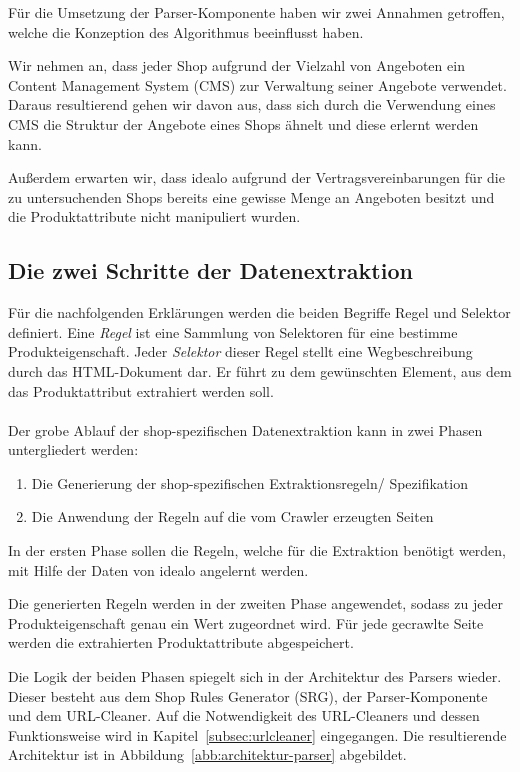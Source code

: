Für die Umsetzung der Parser-Komponente haben wir zwei Annahmen getroffen, welche die Konzeption des Algorithmus
beeinflusst haben.

Wir nehmen an, dass jeder Shop aufgrund der Vielzahl von Angeboten ein Content Management System (CMS) zur Verwaltung
seiner Angebote verwendet.
Daraus resultierend gehen wir davon aus, dass sich durch die Verwendung eines CMS die Struktur der Angebote eines Shops
ähnelt und diese erlernt werden kann.

Außerdem erwarten wir, dass idealo aufgrund der Vertragsvereinbarungen für die zu untersuchenden Shops bereits
eine gewisse Menge an Angeboten besitzt und die Produktattribute nicht manipuliert wurden.

\subsection{Die zwei Schritte der Datenextraktion}
\label{subsec:grundidee}

Für die nachfolgenden Erklärungen werden die beiden Begriffe Regel und Selektor definiert.
Eine \textit{Regel} ist eine Sammlung von Selektoren für eine bestimme Produkteigenschaft.
Jeder \textit{Selektor} dieser Regel stellt eine Wegbeschreibung durch das HTML-Dokument dar.
Er führt zu dem gewünschten Element, aus dem das Produktattribut extrahiert werden soll.
\\
\\
Der grobe Ablauf der shop-spezifischen Datenextraktion kann in zwei Phasen untergliedert werden:
\begin{enumerate}
    \item Die Generierung der shop-spezifischen Extraktionsregeln/ Spezifikation
    \item Die Anwendung der Regeln auf die vom Crawler erzeugten Seiten
\end{enumerate}

In der ersten Phase sollen die Regeln, welche für die Extraktion benötigt werden, mit Hilfe der Daten von idealo
angelernt werden.

Die generierten Regeln werden in der zweiten Phase angewendet, sodass zu jeder Produkteigenschaft genau ein Wert
zugeordnet wird.
Für jede gecrawlte Seite werden die extrahierten Produktattribute abgespeichert.

Die Logik der beiden Phasen spiegelt sich in der Architektur des Parsers wieder.
Dieser besteht aus dem Shop Rules Generator (SRG), der Parser-Komponente und dem URL-Cleaner.
Auf die Notwendigkeit des URL-Cleaners und dessen Funktionsweise wird in Kapitel~\ref{subsec:urlcleaner} eingegangen.
Die resultierende Architektur ist in Abbildung~\ref{abb:architektur-parser} abgebildet.

